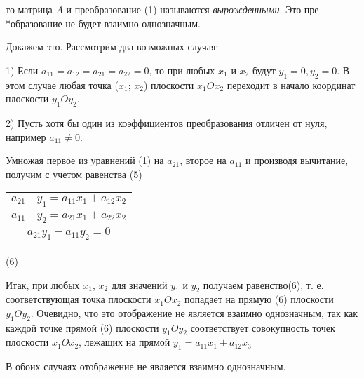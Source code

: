\documentclass[a4paper, 14pt]{article}
\begin{document}
\thispagestyle{first}


то матрица $A$ и преобразование (1) называются \emph{вырожденными}. Это пре-\\*образование не будет взаимно однозначным.

Докажем это. Рассмотрим два возможных случая:

1) Если $a_{11}=a_{12}=a_{21}=a_{22}=0$, то при любых $x_1$ и $x_2$ будут $y_1=0, y_2 = 0$. В этом случае любая точка ($x_{1}$; $x_{2}$) плоскости $x_1Ox_2$ переходит в начало координат плоскости $y_{1}Oy_{2}$.

2) Пусть хотя бы один из коэффициентов преобразования отличен от нуля, например $a_{11} \ne 0$.

Умножая первое из уравнений (1) на $a_{21}$, второе на $a_{11}$ и производя вычитание, получим с учетом равенства (5)

\begin{center}
\begin{tabular}{l | l}
$a_{21}$ & $y_1 = a_{11}x_1 + a_{12}x_2$ \\
$a_{11}$ & $y_2 = a_{21}x_1 + a_{22}x_2$ \\
\hline
\multicolumn{2}{c}{$a_{21}y_1 - a_{11}y_2 = 0$} \\

\end{tabular}
\end{center}


\begin{flushright}
(6)
\end{flushright}

Итак, при любых $x_1$, $x_2$ для значений $y_1$ и $y_2$ получаем равенство(6), т. е. соответствующая точка плоскости $x_1Ox_2$ попадает на прямую (6) плоскости $y_1Oy_2$. Очевидно, что это отображение не является взаимно однозначным, так как каждой точке прямой (6) плоскости $y_1Oy_2$ соответствует совокупность точек плоскости $x_1Ox_2$, лежащих на прямой $y_1=a_{11}x_1 + a_{12}x_3$

В обоих случаях отображение не является взаимно однозначным.
\end{document}
